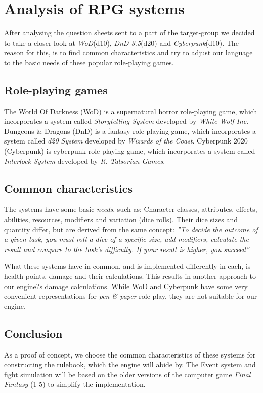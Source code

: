 \section{Analysis of RPG systems}
After analysing the question sheets sent to a part of the target-group we decided to take a closer look at \emph{WoD}(d10), \emph{DnD 3.5}(d20) and \emph{Cyberpunk}(d10). The reason for this, is to find common characteristics and try to adjust our language to the basic needs of these popular role-playing games.

\subsection*{Role-playing games}
The World Of Darkness (WoD) is a supernatural horror role-playing game, which incorporates a system called \emph{Storytelling System} developed by \emph{White Wolf Inc}.
Dungeons \& Dragons (DnD) is a fantasy role-playing game, which incorporates a system called \emph{d20 System} developed by \emph{Wizards of the Coast}.
Cyberpunk 2020 (Cyberpunk) is cyberpunk role-playing game, which incorporates a system called \emph{Interlock System} developed by \emph{R. Talsorian Games}.

\subsection*{Common characteristics}
The systems have some basic \emph{needs}, such as:
Character classes, attributes, effects, abilities, resources, modifiers and variation (dice rolls).
Their dice sizes and quantity differ, but are derived from the same concept: \textit{''To decide the outcome of a given task, you must roll a dice of a specific size, add modifiers, calculate the result and compare to the task's difficulty. If your result is higher, you succeed''}

What these systems have in common, and is implemented differently in each, is health points, damage and their calculations. This results in another approach to our engine?s damage calculations. While WoD and Cyberpunk have some very convenient representations for \emph{pen \& paper} role-play, they are not suitable for our engine.

\subsection*{Conclusion}
As a proof of concept, we choose the common characteristics of these systems for constructing the rulebook, which the engine will abide by. The Event system and fight simulation will be based on the older versions of the computer game \emph{Final Fantasy} (1-5) to simplify the implementation.

